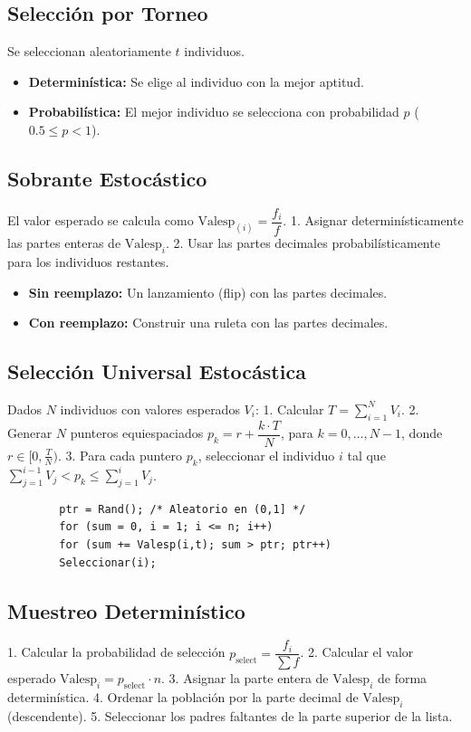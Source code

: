 \documentclass[11pt, letterpaper]{article}
\begin{document}
	\subsection*{Selección por Torneo}
	Se seleccionan aleatoriamente $t$ individuos.
	\begin{itemize}
		\item \textbf{Determinística:} Se elige al individuo con la mejor aptitud.
		\item \textbf{Probabilística:} El mejor individuo se selecciona con probabilidad $p$ ($0.5 \leq p < 1$).
	\end{itemize}
	
	\subsection*{Sobrante Estocástico}
	El valor esperado se calcula como $\text{Valesp}_{(i)} = \dfrac{f_i}{f}$.
	1. Asignar determinísticamente las partes enteras de $\text{Valesp}_i$.
	2. Usar las partes decimales probabilísticamente para los individuos restantes.
	\begin{itemize}
		\item \textbf{Sin reemplazo:} Un lanzamiento (flip) con las partes decimales.
		\item \textbf{Con reemplazo:} Construir una ruleta con las partes decimales.
	\end{itemize}
	
	\subsection*{Selección Universal Estocástica}
	Dados $N$ individuos con valores esperados $V_i$:
	1. Calcular $T = \sum_{i=1}^N V_i$.
	2. Generar $N$ punteros equiespaciados $p_k = r + \dfrac{k \cdot T}{N}$, para $k = 0, \ldots, N-1$, donde $r \in [0, \frac{T}{N})$.
	3. Para cada puntero $p_k$, seleccionar el individuo $i$ tal que $\sum_{j=1}^{i-1} V_j < p_k \leq \sum_{j=1}^{i} V_j$.
	
	\begin{verbatim}
		ptr = Rand(); /* Aleatorio en (0,1] */
		for (sum = 0, i = 1; i <= n; i++)
		for (sum += Valesp(i,t); sum > ptr; ptr++)
		Seleccionar(i);
	\end{verbatim}
	
	\subsection*{Muestreo Determinístico}
	1. Calcular la probabilidad de selección $p_{\text{select}} = \dfrac{f_i}{\sum f}$.
	2. Calcular el valor esperado $\text{Valesp}_i = p_{\text{select}} \cdot n$.
	3. Asignar la parte entera de $\text{Valesp}_i$ de forma determinística.
	4. Ordenar la población por la parte decimal de $\text{Valesp}_i$ (descendente).
	5. Seleccionar los padres faltantes de la parte superior de la lista.
	
\end{document}
